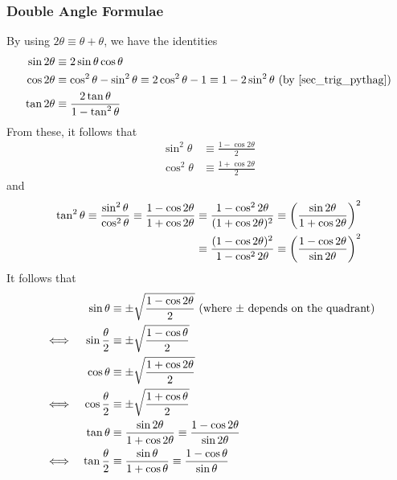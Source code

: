 \documentclass[fleqn,a4paper,11pt]{article}
\begin{document}
    \subsubsection{Double Angle Formulae} \label{sec_trig_double_angle}
    By using \(2\theta \equiv \theta + \theta\), we have the identities
    \begin{align}
    \sin 2\theta &\equiv
       2\sin \theta \cos \theta \\
    \cos 2\theta &\equiv
       \cos^2 \theta - \sin^2 \theta \equiv
       2\cos^2 \theta - 1 \equiv 1 - 2\sin^2 \theta
       \ \text{(by \ref{sec_trig_pythag})} \\
    \tan 2\theta &\equiv
        \frac{2\tan \theta}{1 - \tan^2 \theta}
    \end{align}
    From these, it follows that
    \begin{align}
    \sin^2 \theta &\equiv
        \frac{1 - \cos 2 \theta} 2 \\
    \cos^2 \theta &\equiv
        \frac{1 + \cos 2 \theta} 2
    \end{align}
    and
    \begin{align}
    \tan^2 \theta \equiv \frac{\sin^2 \theta}{\cos^2 \theta}
        \equiv \frac{1 - \cos 2 \theta}{1 + \cos 2 \theta}
        &\equiv \frac{1 - \cos^2 2 \theta}{(1 + \cos 2 \theta)^2}
        \equiv \pqty{\frac{\sin 2 \theta}{1 + \cos 2 \theta}}^2 \\
        &\equiv \frac{(1 - \cos 2 \theta)^2}{1 - \cos^2 2 \theta}
        \equiv \pqty{\frac{1 - \cos 2 \theta}{\sin 2 \theta}}^2
    \end{align}
    It follows that
    \begin{alignat}{2}
    &&\sin \theta &\equiv
        \pm\sqrt{\frac{1 - \cos 2 \theta} 2}
     \ \pqty{\text{where \(\pm\) depends on the quadrant}} \\
    &\iff& \sin \frac \theta 2 &\equiv
        \pm\sqrt{\frac{1 - \cos \theta} 2} \nonumber \\
    &&\cos \theta &\equiv
        \pm\sqrt{\frac{1 + \cos 2 \theta} 2} \\
    &\iff& \cos \frac \theta 2 &\equiv
        \pm\sqrt{\frac{1 + \cos \theta} 2} \nonumber \\
    &&\tan \theta &\equiv
        \frac{\sin 2 \theta}{1 + \cos 2 \theta}
        \equiv \frac{1 - \cos 2 \theta}{\sin 2 \theta} \\
    &\iff& \tan \frac \theta 2 &\equiv
        \frac{\sin \theta}{1 + \cos \theta}
        \equiv \frac{1 - \cos \theta}{\sin \theta} \nonumber
    \end{alignat}
\end{document}
